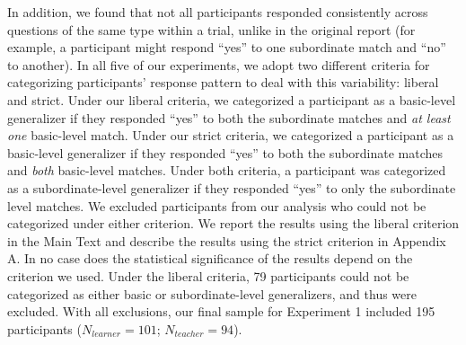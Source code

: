 \documentclass[man]{apa2}
\begin{document}
In addition, we found that not all participants responded consistently across questions of the same type within a trial,  unlike in the original report (for example, a participant might respond ``yes'' to one subordinate match and ``no'' to another). In all five of our experiments, we adopt two different criteria for categorizing participants' response pattern to deal with this variability: liberal and strict. Under our liberal criteria,  we categorized a participant as a basic-level generalizer if they responded ``yes'' to both the subordinate matches and {\it at least one} basic-level match. Under our strict criteria, we categorized a participant as a basic-level generalizer if they responded ``yes'' to both the subordinate matches and {\it both} basic-level matches. Under both criteria, a participant was categorized as a subordinate-level generalizer if they responded ``yes'' to only the subordinate level matches. We excluded participants from our analysis who could not be categorized under either criterion. We report the results using the liberal criterion in the Main Text and describe the results using the strict criterion in Appendix A. In no case does the statistical significance of the results depend on the criterion we used. Under the liberal criteria, 79 participants could not be categorized as either basic or subordinate-level generalizers, and thus were excluded. With all exclusions, our final sample for Experiment 1 included 195 participants  ($N_{learner} = 101$; $N_{teacher} = 94$).
\end{document}
